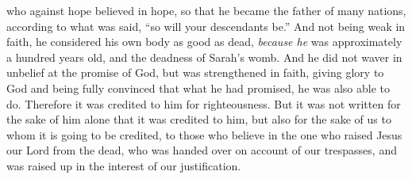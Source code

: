 \begin{biblechapter}
\verse who against hope believed in hope, so that he became the father of many nations, according to what was said, “so will your descendants be.”
\verse And not being weak in faith, he considered his own body as good as dead,  \textit{because he} was approximately a hundred years old, and the deadness of Sarah’s womb.
\verse And he did not waver in unbelief at the promise of God, but was strengthened in faith, giving glory to God
\verse and being fully convinced that what he had promised, he was also able to do.
\verse Therefore it was credited to him for righteousness.
\verse But it was not written for the sake of him alone that it was credited to him,
\verse but also for the sake of us to whom it is going to be credited, to those who believe in the one who raised Jesus our Lord from the dead,
\verse who was handed over on account of our trespasses, and was raised up in the interest of our justification.
\end{biblechapter}

